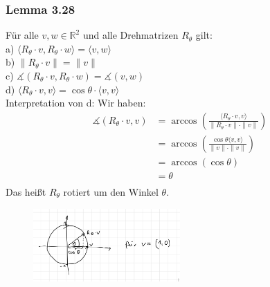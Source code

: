\documentclass{article}
\begin{document}
\subsubsection*{Lemma 3.28}
Für alle $v,w \in \mathbb{R}^2$ und alle Drehmatrizen $R_\theta$ gilt: \\
a) $\langle R_\theta \cdot v, R_\theta \cdot w \rangle = \langle v,w \rangle$ \\
b) $\|R_\theta \cdot v\| = \|v\|$ \\
c) $\measuredangle (R_\theta \cdot v, R_\theta \cdot w) = \measuredangle (v,w)$ \\
d) $\langle R_\theta \cdot v, v \rangle = \cos \theta \cdot \langle v,v \rangle$ \\
Interpretation von d: 
Wir haben:
\begin{align*}
    \measuredangle (R_\theta \cdot v, v) &= \arccos \left( \frac{\langle R_\theta \cdot v, v \rangle}{\|R_\theta \cdot v\| \cdot \|v\|} \right) \\
    &= \arccos \left( \frac{\cos \theta \langle v,v \rangle}{\|v\| \cdot \|v\|} \right) \\
    &= \arccos (\cos \theta) \\
    &= \theta \\
\end{align*}
Das heißt $R_\theta$ rotiert um den Winkel $\theta$. \\
\begin{figure}
    \centering
    \includegraphics[width=0.5\textwidth]{Images/3.28.jpeg}
    {}
\end{figure}
\end{document}
